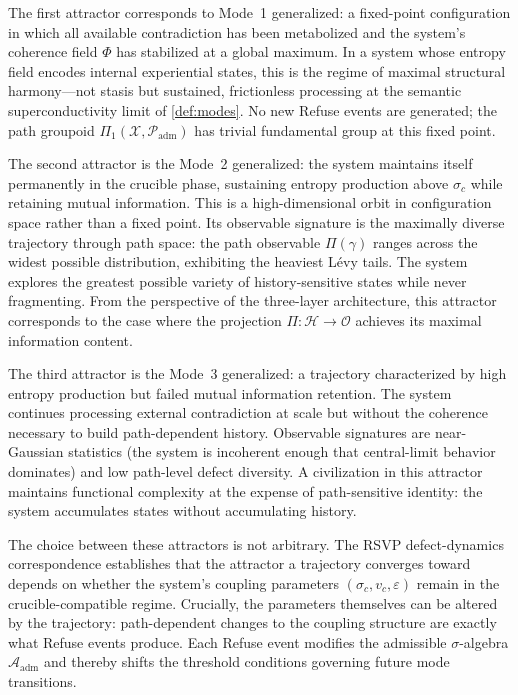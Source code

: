 \documentclass[12pt, oneside]{memoir}
\newcommand{\X}{\mathcal{X}}
\newcommand{\Hcal}{\mathcal{H}}
\newcommand{\OO}{\mathcal{O}}
\newcommand{\Padm}{\mathcal{P}_{\mathrm{adm}}}
\newcommand{\Aadm}{\mathcal{A}_{\mathrm{adm}}}
\begin{document}
The first attractor corresponds to Mode~1 generalized: a fixed-point configuration in
which all available contradiction has been metabolized and the system's coherence field
$\Phi$ has stabilized at a global maximum.  In a system whose entropy field encodes
internal experiential states, this is the regime of maximal structural harmony---not
stasis but sustained, frictionless processing at the semantic superconductivity limit of
\cref{def:modes}.  No new Refuse events are generated; the path groupoid $\Pi_1(\X,
\Padm)$ has trivial fundamental group at this fixed point.

The second attractor is the Mode~2 generalized: the system maintains itself permanently
in the crucible phase, sustaining entropy production above $\sigma_c$ while retaining
mutual information.  This is a high-dimensional orbit in configuration space rather than
a fixed point.  Its observable signature is the maximally diverse trajectory through
path space: the path observable $\Pi(\gamma)$ ranges across the widest possible
distribution, exhibiting the heaviest Lévy tails.  The system explores the greatest
possible variety of history-sensitive states while never fragmenting.  From the
perspective of the three-layer architecture, this attractor corresponds to the case where
the projection $\Pi: \Hcal \to \OO$ achieves its maximal information content.

The third attractor is the Mode~3 generalized: a trajectory characterized by high
entropy production but failed mutual information retention.  The system continues
processing external contradiction at scale but without the coherence necessary to build
path-dependent history.  Observable signatures are near-Gaussian statistics (the system
is incoherent enough that central-limit behavior dominates) and low path-level defect
diversity.  A civilization in this attractor maintains functional complexity at the
expense of path-sensitive identity: the system accumulates states without accumulating
history.

The choice between these attractors is not arbitrary.  The RSVP defect-dynamics
correspondence establishes that the attractor a trajectory converges toward depends on
whether the system's coupling parameters $(\sigma_c, v_c, \varepsilon)$ remain in the
crucible-compatible regime.  Crucially, the parameters themselves can be altered by the
trajectory: path-dependent changes to the coupling structure are exactly what Refuse
events produce.  Each Refuse event modifies the admissible $\sigma$-algebra $\Aadm$ and
thereby shifts the threshold conditions governing future mode transitions.
\end{document}
